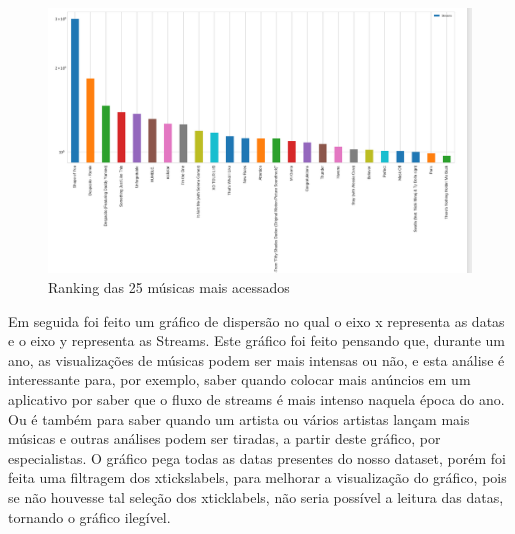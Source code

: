 \documentclass[11pt]{article}
\makeatletter
\def\maxwidth{\ifdim\Gin@nat@width>\linewidth\linewidth
    \else\Gin@nat@width\fi}
\let\Oldincludegraphics\includegraphics
\renewcommand{\includegraphics}[1]{\Oldincludegraphics[width=.8\maxwidth]{#1}}
\makeatother
\begin{document}
\begin{figure}
\centering
\includegraphics{musicas.png}
\caption{Ranking das 25 músicas mais acessados}
\end{figure}

    Em seguida foi feito um gráfico de dispersão no qual o eixo x representa
as datas e o eixo y representa as Streams. Este gráfico foi feito
pensando que, durante um ano, as visualizações de músicas podem ser mais
intensas ou não, e esta análise é interessante para, por exemplo, saber
quando colocar mais anúncios em um aplicativo por saber que o fluxo de
streams é mais intenso naquela época do ano. Ou é também para saber
quando um artista ou vários artistas lançam mais músicas e outras
análises podem ser tiradas, a partir deste gráfico, por especialistas. O
gráfico pega todas as datas presentes do nosso dataset, porém foi feita
uma filtragem dos xtickslabels, para melhorar a visualização do gráfico,
pois se não houvesse tal seleção dos xticklabels, não seria possível a
leitura das datas, tornando o gráfico ilegível.
\end{document}
